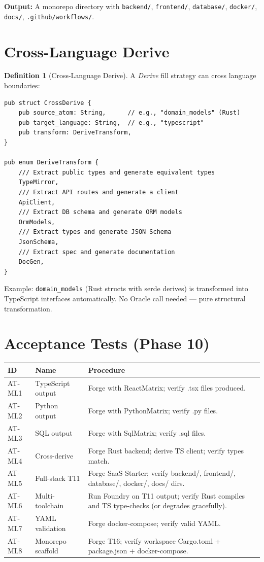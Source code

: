 \documentclass[11pt,a4paper,twoside]{article}
\theoremstyle{definition}
\newtheorem{definition}{Definition}[section]
\theoremstyle{plain}
\theoremstyle{remark}
\begin{document}
\textbf{Output:} A monorepo directory with \texttt{backend/},
\texttt{frontend/}, \texttt{database/}, \texttt{docker/},
\texttt{docs/}, \texttt{.github/workflows/}.


\section{Cross-Language Derive}\label{sec:ml:derive}

\begin{definition}[Cross-Language Derive]\label{def:crossderive}
A \emph{Derive} fill strategy can cross language boundaries:
\begin{lstlisting}
pub struct CrossDerive {
    pub source_atom: String,      // e.g., "domain_models" (Rust)
    pub target_language: String,  // e.g., "typescript"
    pub transform: DeriveTransform,
}

pub enum DeriveTransform {
    /// Extract public types and generate equivalent types
    TypeMirror,
    /// Extract API routes and generate a client
    ApiClient,
    /// Extract DB schema and generate ORM models
    OrmModels,
    /// Extract types and generate JSON Schema
    JsonSchema,
    /// Extract spec and generate documentation
    DocGen,
}
\end{lstlisting}

Example: \texttt{domain\_models} (Rust structs with serde derives) is
transformed into TypeScript interfaces automatically. No Oracle call
needed --- pure structural transformation.
\end{definition}


\section{Acceptance Tests (Phase 10)}\label{sec:ml:tests}

\begin{longtable}{l l p{5.5cm}}
\toprule
\textbf{ID} & \textbf{Name} & \textbf{Procedure} \\
\midrule
AT-ML1 & TypeScript output & Forge with ReactMatrix; verify .tsx
  files produced. \\
AT-ML2 & Python output & Forge with PythonMatrix; verify .py files. \\
AT-ML3 & SQL output & Forge with SqlMatrix; verify .sql files. \\
AT-ML4 & Cross-derive & Forge Rust backend; derive TS client; verify
  types match. \\
AT-ML5 & Full-stack T11 & Forge SaaS Starter; verify backend/,
  frontend/, database/, docker/, docs/ dirs. \\
AT-ML6 & Multi-toolchain & Run Foundry on T11 output; verify Rust
  compiles and TS type-checks (or degrades gracefully). \\
AT-ML7 & YAML validation & Forge docker-compose; verify valid YAML. \\
AT-ML8 & Monorepo scaffold & Forge T16; verify workspace Cargo.toml
  + package.json + docker-compose. \\
\end{longtable}
\end{document}
